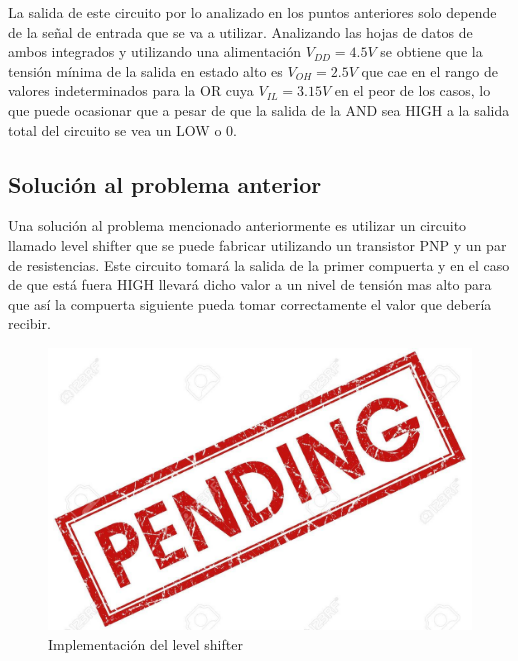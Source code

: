 \documentclass[a4paper]{article}
\begin{document}
La salida de este circuito por lo analizado en los puntos anteriores solo depende de la señal de entrada que se va a utilizar. Analizando las hojas de datos de ambos integrados y utilizando una alimentación $V_{DD}= 4.5V $ se obtiene que la tensión mínima de la salida en estado alto es $V_{OH}=2.5 V$ que cae en el rango de valores indeterminados para la OR cuya $V_{IL}= 3.15 V$ en el peor de los casos, lo que puede ocasionar que a pesar de que la salida de la AND sea HIGH a la salida total del circuito se vea un LOW o 0.


\subsection{Solución al problema anterior}

Una solución al problema mencionado anteriormente es utilizar un circuito llamado level shifter que se puede fabricar utilizando un transistor PNP y un par de resistencias. Este circuito tomará la salida de la primer compuerta y en el caso de que está fuera HIGH llevará dicho valor a un nivel de tensión mas alto para que así la compuerta siguiente pueda tomar correctamente el valor que debería recibir.


\begin{figure}[h]
    \centering
    \includegraphics{ImagenesEjercicio5/pend.jpg}
    \caption{Implementación del level shifter}
\end{figure}
\end{document}
